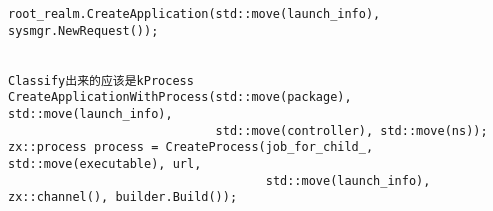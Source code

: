 \begin{verbatim}
root_realm.CreateApplication(std::move(launch_info), sysmgr.NewRequest());


Classify出来的应该是kProcess
CreateApplicationWithProcess(std::move(package), std::move(launch_info),
                             std::move(controller), std::move(ns));
zx::process process = CreateProcess(job_for_child_, std::move(executable), url,
                                    std::move(launch_info), zx::channel(), builder.Build());

\end{verbatim}